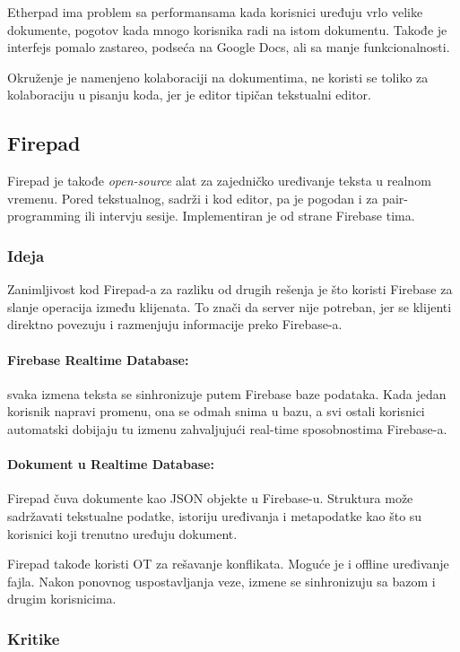 \documentclass[12pt]{article}
\begin{document}
Etherpad ima problem sa performansama kada korisnici uređuju vrlo velike dokumente, pogotov kada mnogo korisnika radi na istom dokumentu. Takođe je interfejs pomalo zastareo, podseća na Google Docs, ali sa manje funkcionalnosti. 

Okruženje je namenjeno kolaboraciji na dokumentima, ne koristi se toliko za kolaboraciju u pisanju koda, jer je editor tipičan tekstualni editor.

\subsection{Firepad}

Firepad je takođe \textit{open-source} alat za zajedničko uređivanje teksta u realnom vremenu. Pored tekstualnog, sadrži i kod editor, pa je pogodan i za pair-programming ili intervju sesije. Implementiran je od strane Firebase tima. \cite{firepad}

\subsubsection{Ideja}

Zanimljivost kod Firepad-a za razliku od drugih rešenja je što koristi Firebase za slanje operacija između klijenata. To znači da server nije potreban, jer se klijenti direktno povezuju i razmenjuju informacije preko Firebase-a. 

\paragraph{Firebase Realtime Database: } svaka izmena teksta se sinhronizuje putem Firebase baze podataka. Kada jedan korisnik napravi promenu, ona se odmah snima u bazu, a svi ostali korisnici automatski dobijaju tu izmenu zahvaljujući real-time sposobnostima Firebase-a.

\paragraph{Dokument u Realtime Database: } Firepad čuva dokumente kao JSON objekte u Firebase-u. Struktura može sadržavati tekstualne podatke, istoriju uređivanja i metapodatke kao što su korisnici koji trenutno uređuju dokument.

Firepad takođe koristi OT za rešavanje konflikata. Moguće je i offline uređivanje fajla. Nakon ponovnog uspostavljanja veze, izmene se sinhronizuju sa bazom i drugim korisnicima.

\subsubsection{Kritike}
\end{document}
